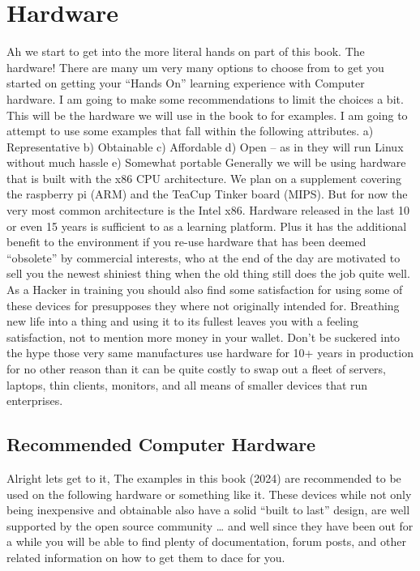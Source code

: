\chapter{Hardware}

Ah we start to get into the more literal hands on part of this book. The hardware! There are many um very many options to choose from to get you started on getting your “Hands On” learning experience with Computer hardware. I am going to make some recommendations to limit the choices a bit. This will be the hardware we will use in the book to for examples. I am going to attempt to use some examples that fall within the following attributes. 
a) Representative
b) Obtainable
c) Affordable 
d) Open – as in they will run Linux without much hassle
e) Somewhat portable
Generally we will be using hardware that is built with the x86 CPU architecture. We plan on a supplement covering the raspberry pi (ARM) and the TeaCup Tinker board (MIPS). But for now the very most common architecture is the Intel x86.
Hardware released in the last 10 or even 15 years is sufficient to as a learning platform. Plus it has the additional benefit to the environment if you re-use hardware that has been deemed “obsolete” by commercial interests, who at the end of the day are motivated to sell you the newest shiniest thing when the old thing still does the job quite well. 
As a Hacker in training you should also find some satisfaction for using some of these devices for presupposes they where not originally intended for. Breathing new life into a thing and using it to its fullest leaves you with a feeling satisfaction, not to mention more money in your wallet. Don’t be suckered into the hype those very same manufactures use hardware for 10+ years in production for no other reason than it can be quite costly to swap out a fleet of servers, laptops, thin clients, monitors, and all means of smaller devices that run enterprises.

\section{Recommended Computer Hardware}

Alright lets get to it, The examples in this book (2024) are recommended to be used on the following hardware or something like it. These devices while not only being inexpensive and obtainable also have a solid “built to last” design, are well supported by the open source community … and well since they have been out for a while you will be able to find plenty of documentation, forum posts, and other related information on how to get them to dace for you. 
